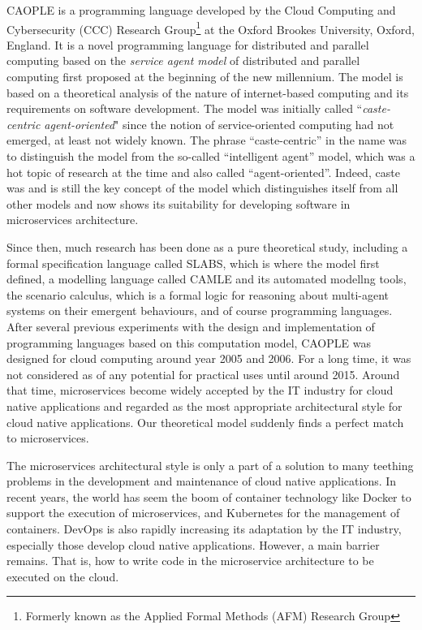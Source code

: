 \documentclass[english]{report}
\begin{document}
CAOPLE is a programming language developed by the Cloud Computing and Cybersecurity (CCC) Research 
Group\footnote{ Formerly known as the Applied Formal Methods (AFM) Research Group} at the Oxford 
Brookes University, Oxford, England. It is a novel programming language for distributed and 
parallel computing based on the \emph{service agent model} of distributed and parallel computing 
first proposed at the beginning of the new millennium. The model is based on a theoretical analysis 
of the nature of internet-based computing and its requirements on software development. The model 
was initially called ``\emph{caste-centric agent-oriented}" since the notion of service-oriented 
computing had not emerged, at least not widely known. The phrase ``caste-centric'' in the name was 
to distinguish the model from the so-called ``intelligent agent'' model, which was a hot topic of research 
at the time and also called ``agent-oriented''. Indeed, caste was and is still the key concept of 
the model which distinguishes itself from all other models and now shows its suitability for 
developing software in microservices architecture. 

Since then, much research has been done as a pure theoretical study, including a formal specification 
language called SLABS, which is where the model first defined, a modelling language called CAMLE and  
its automated modellng tools, the scenario calculus, which is a formal logic for reasoning about 
multi-agent systems on their emergent behaviours, and of course programming languages. After several 
previous experiments with the design and implementation of programming languages based on this 
computation model, CAOPLE was designed for cloud computing around year 2005 and 2006. For a long time, it 
was not considered as of any potential for practical uses until around 2015. Around that time, 
microservices become widely accepted by the IT industry for cloud native applications and regarded 
as the most appropriate architectural style for cloud native applications. Our theoretical model 
suddenly finds a perfect match to microservices. 

The microservices architectural style is only a part of a solution to many teething problems in the 
development and maintenance of cloud native applications. In recent years, the world has seem the 
boom of container technology like Docker to 
support the execution of microservices, and Kubernetes for the management of containers. DevOps is 
also rapidly increasing its adaptation by the IT industry, especially those develop cloud native 
applications. However, a main barrier remains. 
That is, how to write code in the microservice architecture to be executed on the cloud. 
\end{document}
